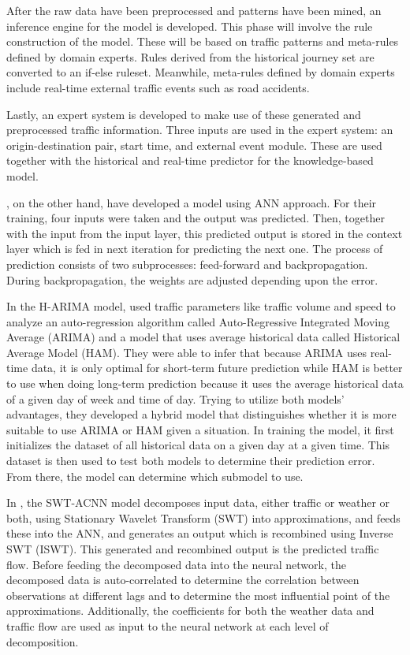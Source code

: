 After the raw data have been preprocessed and patterns have been mined, an inference engine for the model is developed. This phase will involve the rule construction of the model. These will be based on traffic patterns and meta-rules defined by domain experts. Rules derived from the historical journey set are converted to an if-else ruleset. Meanwhile, meta-rules defined by domain experts include real-time external traffic events such as road accidents. 

Lastly, an expert system is developed to make use of these generated and preprocessed traffic information. Three inputs are used in the expert system: an origin-destination pair, start time, and external event module. These are used together with the historical and real-time predictor for the knowledge-based model.

, on the other hand, have developed a model using ANN approach. For their training, four inputs were taken and the output was predicted. Then, together with the input from the input layer, this predicted output is stored in the context layer which is fed in next iteration for predicting the next one. The process of prediction consists of two subprocesses: feed-forward and backpropagation. During backpropagation, the weights are adjusted depending upon the error.

In the H-ARIMA model,  used traffic parameters like traffic volume and speed to analyze an auto-regression algorithm called Auto-Regressive Integrated Moving Average (ARIMA) and a model that uses average historical data called Historical Average Model (HAM). They were able to infer that because ARIMA uses real-time data, it is only optimal for short-term future prediction while HAM is better to use when doing long-term prediction because it uses the average historical data of a given day of week and time of day. Trying to utilize both models’ advantages, they developed a hybrid model that distinguishes whether it is more suitable to use ARIMA or HAM given a situation. In training the model, it first initializes the dataset of all historical data on a given day at a given time. This dataset is then used to test both models to determine their prediction error. From there, the model can determine which submodel to use.

In  , the SWT-ACNN model decomposes input data, either traffic or weather or both, using Stationary Wavelet Transform (SWT) into approximations, and feeds these into the ANN, and generates an output which is recombined using Inverse SWT (ISWT). This generated and recombined output is the predicted traffic flow. Before feeding the decomposed data into the neural network, the decomposed data is auto-correlated to determine the correlation between observations at different lags and to determine the most influential point of the approximations. Additionally, the coefficients for both the weather data and traffic flow are used as input to the neural network at each level of decomposition.

